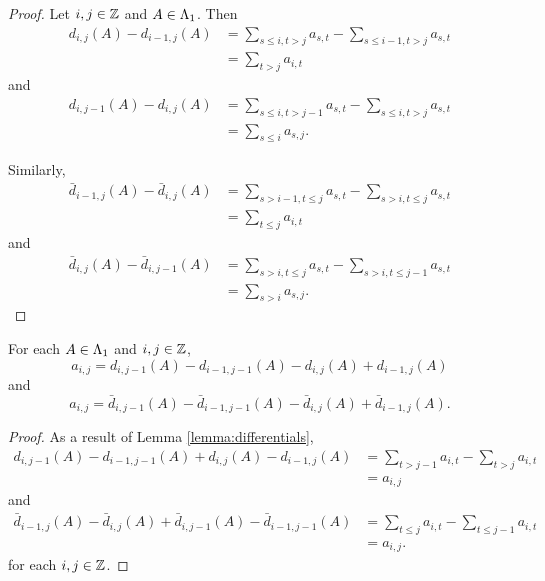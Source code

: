 \documentclass[a4paper, 11pt, twoside]{report}
\begin{document}
\begin{proof}
Let $i,j\in\mathbb{Z}$ and $A\in\Lambda_1{}$. Then
\begin{align*}
d_{i,j}{(A)} - d_{i-1,j}{(A)}
&= \sum_{s\le i,t>j} a_{s,t} -\sum_{s\le i-1,t>j} a_{s,t}\\
&= \sum_{t>j}a_{i,t}
\end{align*}
and
\begin{align*}
d_{i,j-1}{(A)}-d_{i,j}{(A)}
&= \sum_{s\le i,t>j-1} a_{s,t} -\sum_{s\le i,t>j} a_{s,t}\\
&= \sum_{s\le i} a_{s,j}.
\end{align*}

Similarly,
\begin{align*}
\bar{d}_{i-1,j}{(A)} - \bar{d}_{i,j}{(A)}
&= \sum_{s>i-1,t\le j} a_{s,t} -\sum_{s>i,t\le j} a_{s,t}\\
&= \sum_{t\le j} a_{i,t}
\end{align*}
and
\begin{align*}
\bar{d}_{i,j}{(A)} -\bar{d}_{i,j-1}{(A)}
&= \sum_{s>i,t\le j} a_{s,t} -\sum_{s>i,t\le j-1} a_{s,t}\\
&= \sum_{s>i} a_{s,j}.
\end{align*}
\end{proof}

\begin{lemma}\label{lemma:antisymmetry}
For each $A\in\Lambda_1{}$ and $i,j\in\mathbb{Z}$,
\begin{equation*}
a_{i,j} = d_{i,j-1}{(A)} - d_{i-1,j-1}{(A)} - d_{i,j}{(A)} + d_{i-1,j}{(A)}
\end{equation*}
and
\begin{equation*}
a_{i,j} = \bar{d}_{i,j-1}{(A)} - \bar{d}_{i-1,j-1}{(A)} - \bar{d}_{i,j}{(A)} + \bar{d}_{i-1,j}{(A)}.
\end{equation*}
\end{lemma}

\begin{proof}
As a result of Lemma \ref{lemma:differentials},
\begin{align*}
d_{i,j-1}{(A)} -d_{i-1,j-1}{(A)}  +d_{i,j}{(A)} -d_{i-1,j}{(A)}
&= \sum_{t>j-1} a_{i,t} - \sum_{t>j} a_{i,t}\\
&= a_{i,j}
\end{align*}
and
\begin{align*}
\bar{d}_{i-1,j}{(A)} -\bar{d}_{i,j}{(A)} +\bar{d}_{i,j-1}{(A)} -\bar{d}_{i-1,j-1}{(A)}
&= \sum_{t\le j} a_{i,t} -\sum_{t\le j-1} a_{i,t}\\
&= a_{i,j}.
\end{align*}
for each $i,j\in\mathbb{Z}$.
\end{proof}
\end{document}
